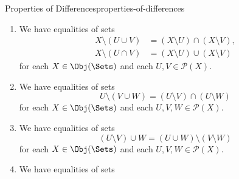 \begin{proposition}{Properties of Differences}{properties-of-differences}
\begin{enumerate}
\begin{itemize}
\begin{align*}
                        \iota_{U} &\colon U\hookrightarrow V
                    \end{align*}
                    of $\mathcal{P}(X)\times\mathcal{P}(X)$, the image
                    \[
                        \iota_{U}\setminus\iota_{V}%
                        \colon%
                        A\setminus V%
                        \hookrightarrow%
                        B\setminus U%
                    \]%
                    of $(\iota_{U},\iota_{V})$ by $\setminus$ is the inclusion
                    \[
                        A\setminus V%
                        \subset
                        B\setminus U%
                    \]%
                    i.e.\ where we have
                    \begin{itemize}
                        \item[$(\star)$]If $A\subset B$ and $U\subset V$, then $A\setminus V\subset B\setminus U$.
                    \end{itemize}
            \end{itemize}
            and where $U\setminus-$ and $-\setminus V$ are the partial functors of $-_{1}\setminus-_{2}$ at $U,V\in\mathcal{P}(X)$.
        \item\label{properties-of-differences-de-morgan-s-laws}We have equalities of sets%
            \begin{align*}
                X\setminus(U\cup V)  &= (X\setminus U)\cap(X\setminus V),\\
                X\setminus(U\cap V)  &= (X\setminus U)\cup(X\setminus V)
            \end{align*}
            for each $X\in\Obj(\Sets)$ and each $U,V\in\mathcal{P}(X)$.
        \item\label{properties-of-differences-interaction-with-unions-1}We have equalities of sets
            \[%
                U\setminus(V\cup W)%
                =%
                (U\setminus V)\cap(U\setminus W)
            \]%
            for each $X\in\Obj(\Sets)$ and each $U,V,W\in\mathcal{P}(X)$.
        \item\label{properties-of-differences-interaction-with-unions-2}We have equalities of sets
            \[%
                (U\setminus V)\cup W%
                =%
                (U\cup W)\setminus(V\setminus W)%
            \]%
            for each $X\in\Obj(\Sets)$ and each $U,V,W\in\mathcal{P}(X)$.
        \item\label{properties-of-differences-interaction-with-unions-3}We have equalities of sets

\end{enumerate}
\end{proposition}
